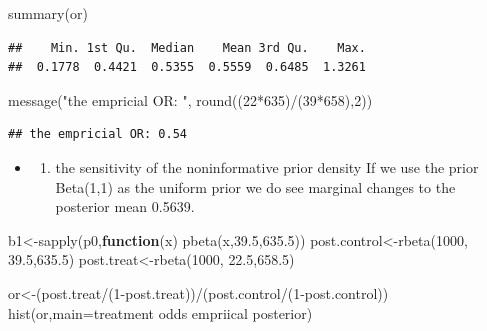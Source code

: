\documentclass[
]{book}
\newenvironment{Shaded}{\begin{snugshade}}{\end{snugshade}}
\newcommand{\AttributeTok}[1]{\textcolor[rgb]{0.77,0.63,0.00}{#1}}
\newcommand{\ControlFlowTok}[1]{\textcolor[rgb]{0.13,0.29,0.53}{\textbf{#1}}}
\newcommand{\DecValTok}[1]{\textcolor[rgb]{0.00,0.00,0.81}{#1}}
\newcommand{\FloatTok}[1]{\textcolor[rgb]{0.00,0.00,0.81}{#1}}
\newcommand{\FunctionTok}[1]{\textcolor[rgb]{0.00,0.00,0.00}{#1}}
\newcommand{\NormalTok}[1]{#1}
\newcommand{\OtherTok}[1]{\textcolor[rgb]{0.56,0.35,0.01}{#1}}
\newcommand{\SpecialCharTok}[1]{\textcolor[rgb]{0.00,0.00,0.00}{#1}}
\newcommand{\StringTok}[1]{\textcolor[rgb]{0.31,0.60,0.02}{#1}}
\providecommand{\tightlist}{%
  \setlength{\itemsep}{0pt}\setlength{\parskip}{0pt}}
\theoremstyle{definition}
\theoremstyle{definition}
\theoremstyle{definition}
\theoremstyle{definition}
\theoremstyle{remark}
\begin{document}
\begin{Shaded}
\begin{Highlighting}[]
  \FunctionTok{summary}\NormalTok{(or)}
\end{Highlighting}
\end{Shaded}

\begin{verbatim}
##    Min. 1st Qu.  Median    Mean 3rd Qu.    Max. 
##  0.1778  0.4421  0.5355  0.5559  0.6485  1.3261
\end{verbatim}

\begin{Shaded}
\begin{Highlighting}[]
  \FunctionTok{message}\NormalTok{(}\StringTok{"the empricial OR: "}\NormalTok{, }\FunctionTok{round}\NormalTok{((}\DecValTok{22}\SpecialCharTok{*}\DecValTok{635}\NormalTok{)}\SpecialCharTok{/}\NormalTok{(}\DecValTok{39}\SpecialCharTok{*}\DecValTok{658}\NormalTok{),}\DecValTok{2}\NormalTok{))}
\end{Highlighting}
\end{Shaded}

\begin{verbatim}
## the empricial OR: 0.54
\end{verbatim}

\begin{itemize}
\item
  \begin{enumerate}
  \def\labelenumi{(\alph{enumi})}
  \setcounter{enumi}{2}
  \tightlist
  \item
    the sensitivity of the noninformative prior density
    If we use the prior Beta(1,1) as the uniform prior we do see marginal changes to the posterior mean 0.5639.
  \end{enumerate}
\end{itemize}

\begin{Shaded}
\begin{Highlighting}[]
\NormalTok{b1}\OtherTok{\textless{}{-}}\FunctionTok{sapply}\NormalTok{(p0,}\ControlFlowTok{function}\NormalTok{(x) }\FunctionTok{pbeta}\NormalTok{(x,}\FloatTok{39.5}\NormalTok{,}\FloatTok{635.5}\NormalTok{))}
\NormalTok{ post.control}\OtherTok{\textless{}{-}}\FunctionTok{rbeta}\NormalTok{(}\DecValTok{1000}\NormalTok{, }\FloatTok{39.5}\NormalTok{,}\FloatTok{635.5}\NormalTok{)}
\NormalTok{  post.treat}\OtherTok{\textless{}{-}}\FunctionTok{rbeta}\NormalTok{(}\DecValTok{1000}\NormalTok{, }\FloatTok{22.5}\NormalTok{,}\FloatTok{658.5}\NormalTok{)}

\NormalTok{  or}\OtherTok{\textless{}{-}}\NormalTok{(post.treat}\SpecialCharTok{/}\NormalTok{(}\DecValTok{1}\SpecialCharTok{{-}}\NormalTok{post.treat))}\SpecialCharTok{/}\NormalTok{(post.control}\SpecialCharTok{/}\NormalTok{(}\DecValTok{1}\SpecialCharTok{{-}}\NormalTok{post.control))}
  \FunctionTok{hist}\NormalTok{(or,}\AttributeTok{main=}\StringTok{\textquotesingle{}treatment odds empriical posterior\textquotesingle{}}\NormalTok{)}
\end{Highlighting}
\end{Shaded}
\end{document}
